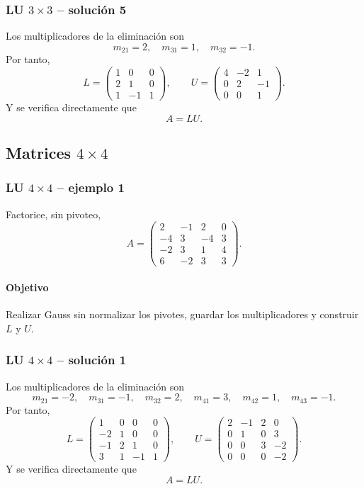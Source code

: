 \subsubsection*{LU $3\times 3$ -- solución 5}

Los multiplicadores de la eliminación son
\[
m_{21}=2,\quad m_{31}=1,\quad m_{32}=-1.
\]
Por tanto,
\[
L=\begin{pmatrix}1 & 0 & 0\\2 & 1 & 0\\1 & -1 & 1\end{pmatrix},\qquad U=\begin{pmatrix}4 & -2 & 1\\0 & 2 & -1\\0 & 0 & 1\end{pmatrix}.
\]
Y se verifica directamente que
\[
\boxed{A=LU}.
\]

\subsection{Matrices $4\times 4$}

\subsubsection*{LU $4\times 4$ -- ejemplo 1}

Factorice, sin pivoteo,
\[
A=\begin{pmatrix}2 & -1 & 2 & 0\\-4 & 3 & -4 & 3\\-2 & 3 & 1 & 4\\6 & -2 & 3 & 3\end{pmatrix}.
\]

\paragraph{Objetivo}
Realizar Gauss sin normalizar los pivotes, guardar los multiplicadores y construir $L$ y $U$.



\subsubsection*{LU $4\times 4$ -- solución 1}

Los multiplicadores de la eliminación son
\[
m_{21}=-2,\quad m_{31}=-1,\quad m_{32}=2,\quad m_{41}=3,\quad m_{42}=1,\quad m_{43}=-1.
\]
Por tanto,
\[
L=\begin{pmatrix}1 & 0 & 0 & 0\\-2 & 1 & 0 & 0\\-1 & 2 & 1 & 0\\3 & 1 & -1 & 1\end{pmatrix},\qquad U=\begin{pmatrix}2 & -1 & 2 & 0\\0 & 1 & 0 & 3\\0 & 0 & 3 & -2\\0 & 0 & 0 & -2\end{pmatrix}.
\]
Y se verifica directamente que
\[
\boxed{A=LU}.
\]



